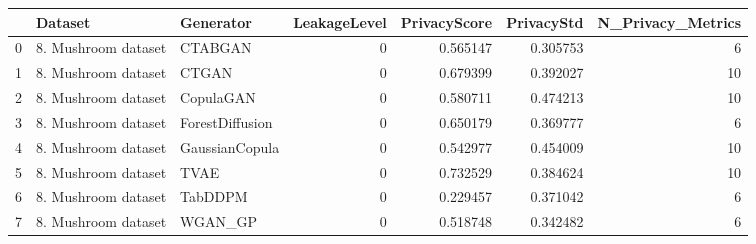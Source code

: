 \begin{tabular}{lllrrrr}
\toprule
 & Dataset & Generator & LeakageLevel & PrivacyScore & PrivacyStd & N_Privacy_Metrics \\
\midrule
0 & 8. Mushroom dataset & CTABGAN & 0 & 0.565147 & 0.305753 & 6 \\
1 & 8. Mushroom dataset & CTGAN & 0 & 0.679399 & 0.392027 & 10 \\
2 & 8. Mushroom dataset & CopulaGAN & 0 & 0.580711 & 0.474213 & 10 \\
3 & 8. Mushroom dataset & ForestDiffusion & 0 & 0.650179 & 0.369777 & 6 \\
4 & 8. Mushroom dataset & GaussianCopula & 0 & 0.542977 & 0.454009 & 10 \\
5 & 8. Mushroom dataset & TVAE & 0 & 0.732529 & 0.384624 & 10 \\
6 & 8. Mushroom dataset & TabDDPM & 0 & 0.229457 & 0.371042 & 6 \\
7 & 8. Mushroom dataset & WGAN_GP & 0 & 0.518748 & 0.342482 & 6 \\
\bottomrule
\end{tabular}
